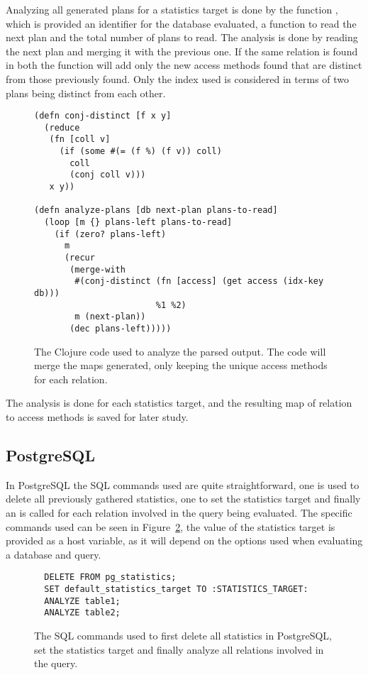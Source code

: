 Analyzing all generated plans for a statistics target is done by the function
, which is provided an identifier for the database evaluated,
a function to read the next plan and the total number of plans to read. The
analysis is done by reading the next plan and merging it with the previous one.
If the same relation is found in both the function  will add
only the new access methods found that are distinct from those previously found.
Only the index used is considered in terms of two plans being distinct from each
other.

\begin{figure}[ht]
\begin{verbatim}
(defn conj-distinct [f x y]
  (reduce
   (fn [coll v]
     (if (some #(= (f %) (f v)) coll)
       coll
       (conj coll v)))
   x y))

(defn analyze-plans [db next-plan plans-to-read]
  (loop [m {} plans-left plans-to-read]
    (if (zero? plans-left)
      m
      (recur
       (merge-with
        #(conj-distinct (fn [access] (get access (idx-key db)))
                        %1 %2)
        m (next-plan))
       (dec plans-left)))))
   \end{verbatim}
   \caption[The Clojure code to analyze a query]{The Clojure code used to
     analyze the parsed output. The code will merge the maps generated, only
     keeping the unique access methods for each relation.}
\label{fig:clj:analyzing}
\end{figure}

The analysis is done for each statistics target, and the resulting map of relation to
access methods is saved for later study.

\subsection{PostgreSQL}\label{sec:postgresql}
In PostgreSQL the SQL commands used are quite straightforward, one is used to
delete all previously gathered statistics, one to set the statistics target and
finally an  is called for each relation involved in the query being
evaluated. The specific commands used can be seen in
Figure~\ref{fig:sql:pganalyze}, the value of the statistics target is provided as a
host variable, as it will depend on the options used when evaluating a database
and query.

\begin{figure}[ht]
\begin{verbatim}
  DELETE FROM pg_statistics;
  SET default_statistics_target TO :STATISTICS_TARGET:
  ANALYZE table1;
  ANALYZE table2;
\end{verbatim}
\caption[Generating new cardinality estimates in PostgreSQL.]{The SQL commands
  used to first delete all statistics in PostgreSQL, set the statistics target
  and finally analyze all relations involved in the query.}
\label{fig:sql:pganalyze}
\end{figure}

